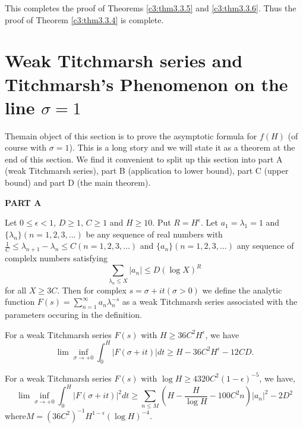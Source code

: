 This completes the proof of Theorems \ref{c3:thm3.3.5} and \ref{c3:thm3.3.6}. Thus the proof of Theorem \ref{c3:thm3.3.4} is complete. 

\section[Weak Titchmarsh series and Titchmarsh's...]{Weak Titchmarsh
  series and Titchmarsh's Phenomenon on the line $\sigma
  =1$}\label{c3:sec3.4} 
The\pageoriginale main object of this section is to prove the asymptotic formula for $f(H)$ (of course with $\sigma =1$). This is a long story and we will state it as a theorem at the end of this section. We find it convenient to split up this section into part A (weak Titchmarsh series), part B  (application to lower bound), part C (upper bound) and part D (the main theorem).

\begin{center} 
\textbf{PART A}
\end{center}

\medskip
{} Let $0 \leq \epsilon < 1$, $D \geq 1 $, $C \geq 1$ and $H \geq 10$. Put $R = H^\epsilon$. Let $a_1 = \lambda_1 = 1$ and $\{\lambda_n\} (n = 1,2,3,\ldots)$ be any sequence of real numbers with $\frac{1}{C} \leq \lambda_{n+1} -\lambda_n \leq C (n = 1,2,3,\ldots)$ and $\{a_n\}(n=1,2,3,\ldots)$ any sequence of complelx numbers satisfying 
$$
\sum\limits_{\lambda_n \leq X} |a_n| \leq D(\log X)^R
$$
for all $X \geq 3C$. Then for complex $s = \sigma + it (\sigma > 0)$ we define the analytic function $F(s) = \sum\limits^\infty_{n=1} a_n \lambda^{-s}_n$ as a weak Titchmarsh series associated with the parameters occuring in the definition.



\begin{alphtheorem}\label{c3:thm3.4A.1} 
For a weak Titchmarsh series $F(s)$ with $H \geq 36 C^2 H^{\epsilon}$, we have
$$
\lim \inf\limits_{\sigma \to  + 0} \int^H_0 |F(\sigma + it)| dt \geq H - 36 C^2 H^\epsilon - 12 CD.
$$
\end{alphtheorem}

\begin{alphtheorem} \label{c3:thm3.4A.2} 
For a weak Titchmarsh series $F(s)$ with $\log H \geq 4 320 C^2 (1-\epsilon)^{-5}$, we have,
$$
\lim \inf\limits_{\sigma \to + 0} \int^H_0 |F(\sigma + it)|^2 dt \geq \sum\limits_{n \leq M} \left(H - \frac{H}{\log H} - 100 C^2 n \right)|a_n|^2 - 2 D^2
$$
where\pageoriginale $M = (36C^2)^{-1} H^{1-\epsilon} (\log H)^{-4}$.
\end{alphtheorem}

